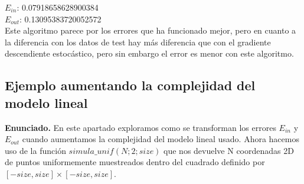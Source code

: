 \documentclass[a4paper,11pt]{article}
\begin{document}
$E_{in}$:  0.07918658628900384\\
$E_{out}$:  0.13095383720052572\\

Este algoritmo parece por los errores que ha funcionado mejor, pero en cuanto a la diferencia con los datos de test hay más diferencia que con el gradiente descendiente estocástico, pero sin embargo el error es menor con este algoritmo.

\subsection{Ejemplo aumentando la complejidad del modelo lineal}

\textbf{Enunciado.} En este apartado exploramos como se transforman los errores $E_{in}$ y $E_{out}$ cuando aumentamos la complejidad del modelo lineal usado. Ahora hacemos uso de la función $simula\_unif(N; 2; size)$ que nos devuelve N coordenadas 2D de puntos uniformemente muestreados dentro del cuadrado definido por $[-size, size] \times [-size, size]$.
\end{document}
